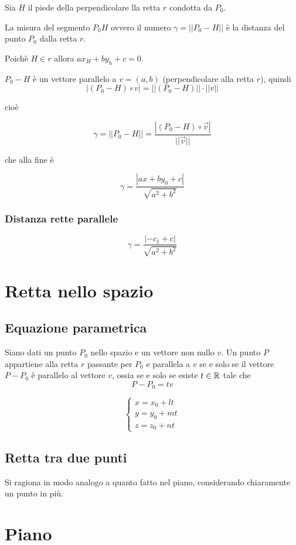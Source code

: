 Sia $H$ il piede della perpendicolare lla retta $r$ condotta da $P_0$.

La misura del segmento $P_0H$ ovvero il numero $\gamma = ||P_0-H||$ è la distanza del punto $P_0$ dalla retta $r$.

Poichè $H \in r$ allora $ax_H+by_h+c=0$.

$P_0-H$ è un vettore parallelo a $v=(a,b)$ (perpendicolare alla retta $r$), quindi $$|(P_0-H) \circ v| = ||(P_0-H)|| \cdot ||v||$$

cioè

$$\gamma = ||P_0-H|| = \frac{|(P_0-H)\circ \vec{v}|}{||\vec{v}||}$$

che alla fine è

$$\gamma = \frac{|ax+by_0+c|}{\sqrt{a^2+b^2}}$$

\subsubsection{Distanza rette parallele}

$$\gamma = \frac{|-c_1 + c|}{\sqrt{a^2+b^2}}$$

\section{Retta nello spazio}

\subsection{Equazione parametrica}

Siano dati un punto $P_0$ nello spazio e un vettore non nullo $v$. Un punto $P$ appartiene alla retta $r$ passante per $P_0$ e parallela a $v$ se e solo se il vettore $P-P_0$ è parallelo al vettore $v$, ossia se e solo se esiste $t \in \mathbb{R}$ tale che $$P-P_0=tv$$

$$
\begin{cases}
x = x_0 + lt \\
y = y_0 + mt \\
z = z_0 + nt
\end{cases}
$$

\subsection{Retta tra due punti}

Si ragiona in modo analogo a quanto fatto nel piano, considerando chiaramente un punto in più.

\section{Piano}

